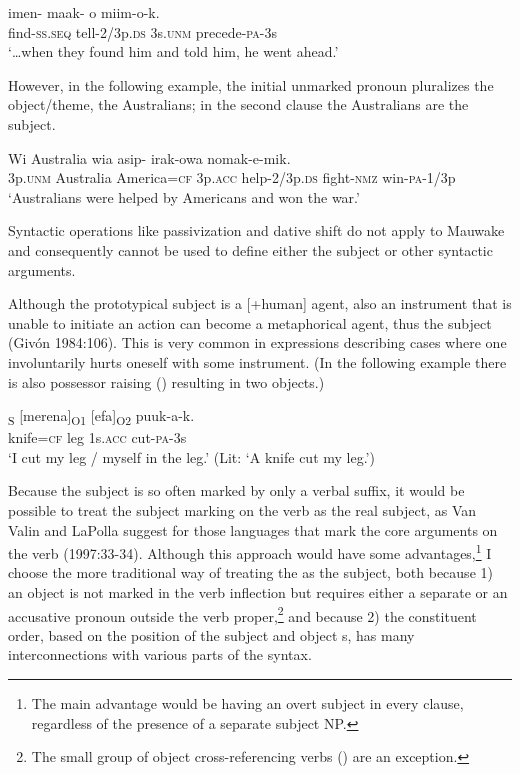 \ea%
\label{ex:x921}
\gll {\dots}imen-  maak-  o  miim-o-k. \\
     find-\textsc{ss}.\textsc{seq}  tell-2/3p.\textsc{ds}  3s.\textsc{unm}  precede-\textsc{pa}-3s \\
\glt `{\dots}when they found him and told him, he went ahead.'
\z

However, in the following example, the initial unmarked pronoun   pluralizes the object/theme, the Australians; in the second clause the Australians are the subject.

\ea%
\label{ex:x922}
\gll Wi  Australia    wia  asip- irak-owa  nomak-e-mik. \\
     3p.\textsc{unm}  Australia  America=\textsc{cf}  3p.\textsc{acc}  help-2/3p.\textsc{ds} fight-\textsc{nmz}  win-\textsc{pa}-1/3p \\
\glt `Australians were helped by Americans and won the war.'
\z

Syntactic operations like passivization and dative shift do not apply to Mauwake and consequently cannot be used to define either the subject or other syntactic arguments. 

Although the prototypical subject is a [+human] agent, also an instrument that is unable to initiate an action can become a metaphorical agent, thus the subject (Giv\'on 1984:106). This is very common in expressions describing cases where one involuntarily hurts oneself with some instrument. (In the following example there is also possessor raising () resulting in two objects.)

\ea%
\label{ex:x958}
\gll [\textstyleEmphasizedVernacularWords{Fura=ke}]\textsubscript{S}  [merena]\textsubscript{O1}  [efa]\textsubscript{O2}  puuk-a-k. \\
     knife=\textsc{cf}  leg  1s.\textsc{acc}  cut-\textsc{pa}-3s \\
\glt `I cut my leg / myself in the leg.' (Lit: `A knife cut my leg.')
\z

Because the subject is so often marked by only a verbal suffix, it would be possible to treat the subject marking on the verb as the real subject, as Van Valin and LaPolla suggest for those languages that mark the core arguments on the verb (1997:33-34). Although this approach would have some advantages,\footnote{The main advantage would be having an overt subject in every clause, regardless of the presence of a separate subject NP.} I choose the more traditional way of treating the  as the subject, both because 1) an object is not marked in the verb inflection but requires either a separate  or an accusative pronoun outside the verb proper,\footnote{The small group of object cross-referencing verbs () are an exception.} and because 2) the constituent order, based on the position of the subject and object s, has many interconnections with various parts of the syntax. 

